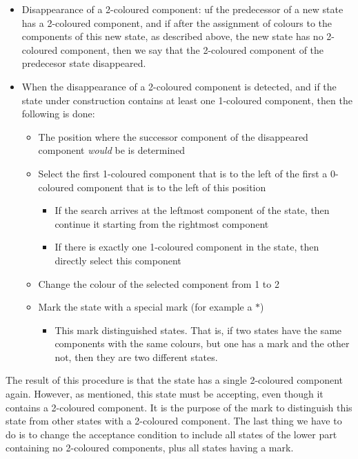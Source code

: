 \begin{itemize}
\item Disappearance of a 2-coloured component: uf the predecessor of a new state has a 2-coloured component, and if after the assignment of colours to the components of this new state, as described above, the new state has no 2-coloured component, then we say that the 2-coloured component of the predecesor state disappeared.
\item When the disappearance of a 2-coloured component is detected, and if the state under construction contains at least one 1-coloured component, then the following is done:
  \begin{itemize}
  \item The position where the successor component of the disappeared component \textit{would} be is determined
  \item Select the first 1-coloured component that is to the left of the first a 0-coloured component that is to the left of this position
    \begin{itemize}
    \item If the search arrives at the leftmost component of the state, then continue it starting from the rightmost component
    \item If there is exactly one 1-coloured component in the state, then directly select this component
    \end{itemize}
  \item Change the colour of the selected component from 1 to 2
  \item Mark the state with a special mark (for example a $*$)
    \begin{itemize}
    \item This mark distinguished states. That is, if two states have the same components with the same colours, but one has a mark and the other not, then they are two different states.
    \end{itemize}
  \end{itemize}
\end{itemize}

The result of this procedure is that the state has a single 2-coloured component again. However, as mentioned, this state must be accepting, even though it contains a 2-coloured component. It is the purpose of the mark to distinguish this state from other states with a 2-coloured component. The last thing we have to do is to change the acceptance condition to include all states of the lower part containing no 2-coloured components, plus all states having a mark.


